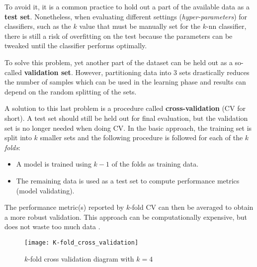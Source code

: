 To avoid it, it is a common practice to hold out a part of the available data as a \textbf{test set}. Nonetheless, when evaluating different settings (\textit{hyper-parameters}) for classifiers, such as the $k$ value that must be manually set for the $k$-nn classifier, there is still a risk of overfitting on the test because the parameters can be tweaked until the classifier performs optimally.

To solve this problem, yet another part of the dataset can be held out as a so-called \textbf{validation set}. However, partitioning data into 3 sets drastically reduces the number of samples which can be used in the learning phase and results can depend on the random splitting of the sets.

A solution to this last problem is a procedure called \textbf{cross-validation} (CV for short). A test set should still be held out for final evaluation, but the validation set is no longer needed when doing CV. In the basic approach, the training set is split into $k$ smaller sets and the following procedure is followed for each of the $k$ \textit{folds}:
\begin{itemize}
	\item A model is trained using $k-1$ of the folds as training data.
	\item The remaining data is used as a test set to compute performance metrics (model validating).
\end{itemize}

The performance metric(s) reported by $k$-fold CV can then be averaged to obtain a more robust validation. This approach can be computationally expensive, but does not waste too much data \cite{scikit-learn}.

\begin{figure}[]
	\centering
	\texttt{[image: K-fold\_cross\_validation]}
	\caption{$k$-fold cross validation diagram with $k=4$}
	\label{fig:k-fold_cross_validation}
\end{figure}

